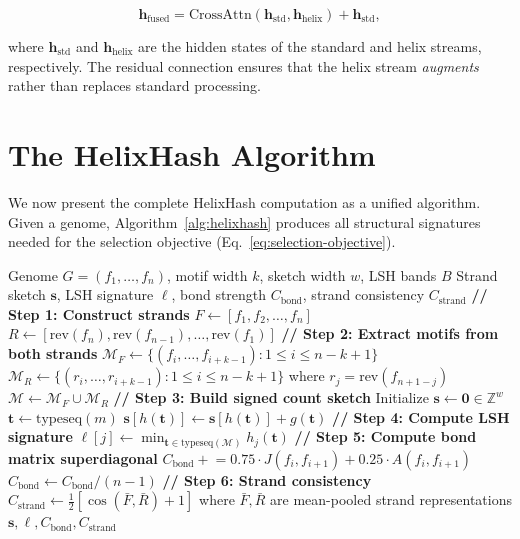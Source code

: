 \begin{equation}
\mathbf{h}_{\text{fused}} = \text{CrossAttn}(\mathbf{h}_{\text{std}}, \mathbf{h}_{\text{helix}}) + \mathbf{h}_{\text{std}},
\label{eq:cross-stream}
\end{equation}

where $\mathbf{h}_{\text{std}}$ and $\mathbf{h}_{\text{helix}}$ are the hidden states of the standard and helix streams, respectively. The residual connection ensures that the helix stream \emph{augments} rather than replaces standard processing.

\section{The HelixHash Algorithm}
\label{sec:helixhash-algorithm}

We now present the complete HelixHash computation as a unified algorithm. Given a genome, Algorithm~\ref{alg:helixhash} produces all structural signatures needed for the selection objective (Eq.~\ref{eq:selection-objective}).

\begin{algorithm}[H]
\caption{HelixHash: Structural Signature Computation}
\label{alg:helixhash}
\begin{algorithmic}[1]
\Require Genome $G = (f_1, \ldots, f_n)$, motif width $k$, sketch width $w$, LSH bands $B$
\Ensure Strand sketch $\mathbf{s}$, LSH signature $\ell$, bond strength $C_{\text{bond}}$, strand consistency $C_{\text{strand}}$
\State \textbf{// Step 1: Construct strands}
\State $F \gets [f_1, f_2, \ldots, f_n]$ 
\State $R \gets [\mathrm{rev}(f_n), \mathrm{rev}(f_{n-1}), \ldots, \mathrm{rev}(f_1)]$ 
\State \textbf{// Step 2: Extract motifs from both strands}
\State $\mathcal{M}_F \gets \{(f_i, \ldots, f_{i+k-1}) : 1 \leq i \leq n - k + 1\}$
\State $\mathcal{M}_R \gets \{(r_i, \ldots, r_{i+k-1}) : 1 \leq i \leq n - k + 1\}$ where $r_j = \mathrm{rev}(f_{n+1-j})$
\State $\mathcal{M} \gets \mathcal{M}_F \cup \mathcal{M}_R$ 
\State \textbf{// Step 3: Build signed count sketch}
\State Initialize $\mathbf{s} \gets \mathbf{0} \in \mathbb{Z}^w$
  \State $\mathbf{t} \gets \mathrm{typeseq}(m)$
  \State $\mathbf{s}[h(\mathbf{t})] \gets \mathbf{s}[h(\mathbf{t})] + g(\mathbf{t})$
\EndFor
\State \textbf{// Step 4: Compute LSH signature}
  \State $\ell[j] \gets \min_{\mathbf{t} \in \mathrm{typeseq}(\mathcal{M})} h_j(\mathbf{t})$
\EndFor
\State \textbf{// Step 5: Compute bond matrix superdiagonal}
  \State $C_{\text{bond}} \mathrel{+}= 0.75 \cdot J(f_i, f_{i+1}) + 0.25 \cdot A(f_i, f_{i+1})$
\EndFor
\State $C_{\text{bond}} \gets C_{\text{bond}} / (n - 1)$
\State \textbf{// Step 6: Strand consistency}
\State $C_{\text{strand}} \gets \frac{1}{2}[\cos(\bar{F}, \bar{R}) + 1]$ where $\bar{F}, \bar{R}$ are mean-pooled strand representations
\State \Return $\mathbf{s}, \ell, C_{\text{bond}}, C_{\text{strand}}$
\end{algorithmic}
\end{algorithm}

